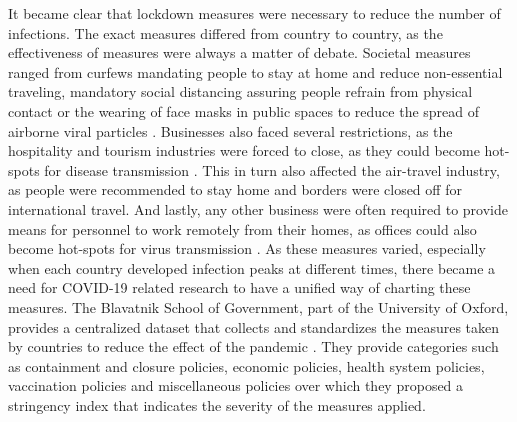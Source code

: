 It became clear that lockdown measures were necessary to reduce the number of infections. The exact measures differed from country to country, as the effectiveness of measures were always a matter of debate. Societal measures ranged from curfews mandating people to stay at home and reduce non-essential traveling, mandatory social distancing assuring people refrain from physical contact \cite{lewnard2020scientific} or the wearing of face masks in public spaces to reduce the spread of airborne viral particles \cite{eikenberry2020}. Businesses also faced several restrictions, as the hospitality and tourism industries were forced to close, as they could become hot-spots for disease transmission \cite{gossling2020pandemics}. This in turn also affected the air-travel industry, as people were recommended to stay home and borders were closed off for international travel. And lastly, any other business were often required to provide means for personnel to work remotely from their homes, as offices could also become hot-spots for virus transmission \cite{dingel2020many}. As these measures varied, especially when each country developed infection peaks at different times, there became a need for COVID-19 related research to have a unified way of charting these measures. The Blavatnik School of Government, part of the University of Oxford, provides a centralized dataset that collects and standardizes the measures taken by countries to reduce the effect of the pandemic \cite{hale2020variation}. They provide categories such as containment and closure policies, economic policies, health system policies, vaccination policies and miscellaneous policies over which they proposed a stringency index that indicates the severity of the measures applied.

